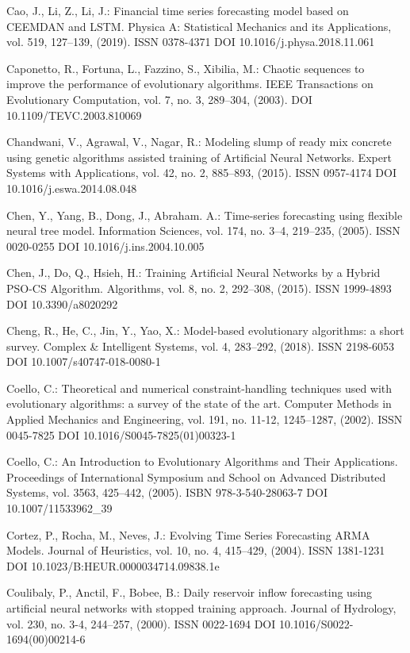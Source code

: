 \begin{thebibliography}{99.}
 Cao, J., Li, Z., Li, J.: Financial time series forecasting model based on CEEMDAN and LSTM. Physica A: Statistical Mechanics and its Applications, vol. 519, 127--139, (2019). ISSN 0378-4371 DOI 10.1016/j.physa.2018.11.061

 Caponetto, R., Fortuna, L., Fazzino, S., Xibilia, M.: Chaotic sequences to improve the performance of evolutionary algorithms. IEEE Transactions on Evolutionary Computation, vol. 7, no. 3, 289--304, (2003). DOI 10.1109/TEVC.2003.810069

 Chandwani, V., Agrawal, V., Nagar, R.: Modeling slump of ready mix concrete using genetic algorithms assisted training of Artificial Neural Networks. Expert Systems with Applications, vol. 42, no. 2, 885--893, (2015). ISSN 0957-4174 DOI 10.1016/j.eswa.2014.08.048

 Chen, Y., Yang, B., Dong, J., Abraham. A.: Time-series forecasting using flexible neural tree model. Information Sciences, vol. 174, no. 3--4, 219--235, (2005). ISSN 0020-0255 DOI 10.1016/j.ins.2004.10.005

 Chen, J., Do, Q., Hsieh, H.: Training Artificial Neural Networks by a Hybrid PSO-CS Algorithm. Algorithms, vol. 8, no. 2, 292--308, (2015). ISSN 1999-4893 DOI 10.3390/a8020292

 Cheng, R., He, C., Jin, Y., Yao, X.: Model-based evolutionary algorithms: a short survey. Complex \& Intelligent Systems, vol. 4, 283--292, (2018). ISSN 2198-6053 DOI 10.1007/s40747-018-0080-1

 Coello, C.: Theoretical and numerical constraint-handling techniques used with evolutionary algorithms: a survey of the state of the art. Computer Methods in Applied Mechanics and Engineering, vol. 191, no. 11-12, 1245--1287, (2002). ISSN 0045-7825 DOI 10.1016/S0045-7825(01)00323-1

 Coello, C.: An Introduction to Evolutionary Algorithms and Their Applications. Proceedings of International Symposium and School on Advanced Distributed Systems, vol. 3563, 425--442, (2005). ISBN 978-3-540-28063-7 DOI 10.1007/11533962\_39

 Cortez, P., Rocha, M., Neves, J.: Evolving Time Series Forecasting ARMA Models. Journal of Heuristics, vol. 10, no. 4, 415--429, (2004). ISSN 1381-1231 DOI 10.1023/B:HEUR.0000034714.09838.1e

 Coulibaly, P., Anctil, F., Bobee, B.: Daily reservoir inflow forecasting using artificial neural networks with stopped training approach. Journal of Hydrology, vol. 230, no. 3-4, 244--257, (2000). ISSN 0022-1694 DOI 10.1016/S0022-1694(00)00214-6


\end{thebibliography}
